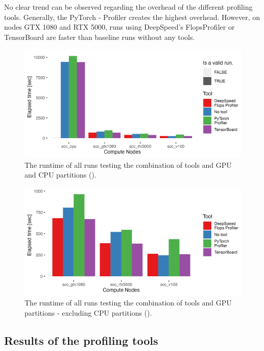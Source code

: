 \documentclass[12pt, a4paper, hidelinks]{article}
\begin{document}
No clear trend can be observed regarding the overhead of the different profiling tools. Generally, the PyTorch - Profiler creates the highest overhead. However, on nodes GTX 1080 and RTX 5000, runs using DeepSpeed's FlopsProfiler or TensorBoard are faster than baseline runs without any tools.

\begin{figure}[H]
\centering
\includegraphics[width=1\textwidth]{./assets/sacct_barplot_by_nodes_no-experiment}
\caption[Runtime of the experiments]{The runtime of all runs testing the combination of tools and \ac{GPU} and \ac{CPU} partitions (). }
\label{fig:sacct_barplot_by_nodes_no-experiment}
\end{figure}

\begin{figure}[H]
\centering
\includegraphics[width=1\textwidth]{./assets/sacct_barplot_by_nodes_no-experiment_gpu}
\caption[Runtime of the experiments (GPU-only)]{The runtime of all runs testing the combination of tools and \ac{GPU} partitions - excluding \ac{CPU} partitions ().}
\label{fig:sacct_barplot_by_nodes_no-experiment_gpu}
\end{figure}

\pagebreak
\subsection{Results of the profiling tools}
\end{document}
